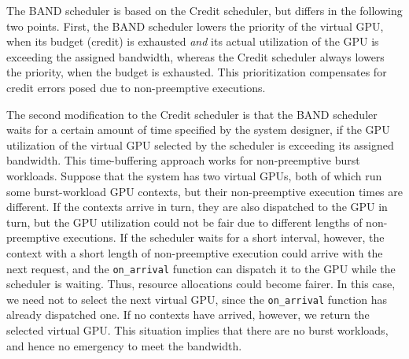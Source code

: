 The BAND scheduler is based on the Credit scheduler, but differs in the
following two points.
First, the BAND scheduler lowers the priority of the virtual GPU, when
its budget (credit) is exhausted \textit{and} its actual utilization of
the GPU is exceeding the assigned bandwidth, whereas the Credit
scheduler always lowers the priority, when the budget is exhausted.
This prioritization compensates for credit errors posed due to
non-preemptive executions.

The second modification to the Credit scheduler is that the BAND
scheduler waits for a certain amount of time specified by the system
designer, if the GPU utilization of the virtual GPU selected
by the scheduler is exceeding its assigned bandwidth.
This time-buffering approach works for non-preemptive burst workloads.
Suppose that the system has two virtual GPUs, both of which run some
burst-workload GPU contexts, but their non-preemptive execution times
are different.
If the contexts arrive in turn, they are also dispatched to the GPU in
turn, but the GPU utilization could not be fair due to different lengths
of non-preemptive executions.
If the scheduler waits for a short interval, however, the context with a
short length of non-preemptive execution could arrive with the next
request, and the \texttt{on\_arrival} function can dispatch it to the
GPU while the scheduler is waiting.
Thus, resource allocations could become fairer.
In this case, we need not to select the next virtual GPU, since the
\texttt{on\_arrival} function has already dispatched one.
If no contexts have arrived, however, we return the selected virtual GPU.
This situation implies that there are no burst workloads, and hence no
emergency to meet the bandwidth.
